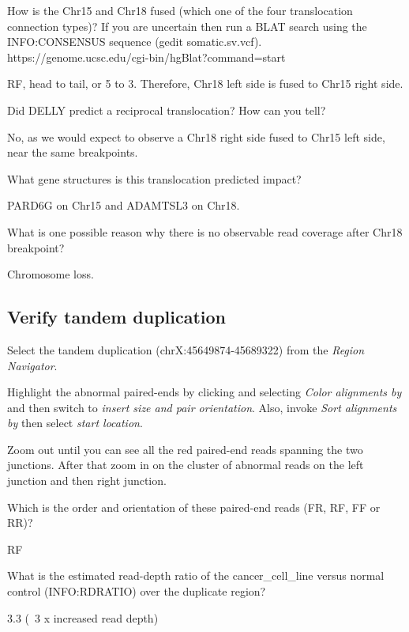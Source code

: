 \begin{questions}
How is the Chr15 and Chr18 fused (which one of the four translocation connection types)? \newline
If you are uncertain then run a BLAT search using the INFO:CONSENSUS sequence (gedit  somatic.sv.vcf). https://genome.ucsc.edu/cgi-bin/hgBlat?command=start
\begin{answer}
RF, head to tail, or 5 to 3. Therefore, Chr18 left side is fused to Chr15 right side.
\end{answer}
Did DELLY predict a reciprocal translocation? How can you tell? 
\begin{answer}
No, as we would expect to observe a Chr18 right side fused to Chr15 left side, near the same breakpoints.  
\end{answer}
What gene structures is this translocation predicted impact? 
\begin{answer}
PARD6G on Chr15 and ADAMTSL3 on Chr18.
\end{answer}
What is one possible reason why there is no observable read coverage after Chr18 breakpoint? 
\begin{answer}
Chromosome loss.
\end{answer}
\end{questions}

\subsection{Verify tandem duplication}
\begin{advanced}
\begin{steps}
Select the tandem duplication (chrX:45649874-45689322) from the \emph{Region Navigator}.

Highlight the abnormal paired-ends by clicking and selecting \emph{Color alignments by} and then switch to \emph{insert size and pair orientation}. Also, invoke \emph{Sort alignments by} then select \emph{start location}.

Zoom out until you can see all the red paired-end reads spanning the two junctions. After that zoom in on the cluster of abnormal reads on the left junction and then right junction.
\end{steps}
\end{advanced}

\begin{questions}
Which is the order and orientation of these paired-end reads (FR, RF, FF or RR)? 
\begin{answer}
RF
\end{answer}
What is the estimated read-depth ratio of the cancer\_cell\_line versus normal control (INFO:RDRATIO) over the duplicate region? 
\begin{answer}
3.3 (~3 x increased read depth) 
\end{answer}
\end{questions}


